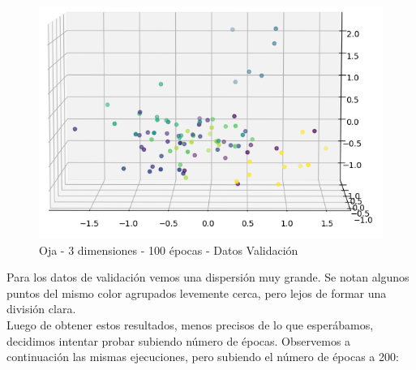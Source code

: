 \begin{figure}[h]
  \begin{center}
    \includegraphics[scale=0.65]{../img/ej1/oja/oja_3salida_100ep_validation_2.png}
  \caption{Oja - 3 dimensiones - 100 épocas - Datos Validación}
  \end{center}
\end{figure}

\newpage

Para los datos de validación vemos una dispersión muy grande. Se notan algunos puntos del mismo color agrupados levemente cerca, pero lejos
de formar una división clara.\\

Luego de obtener estos resultados, menos precisos de lo que esperábamos, decidimos intentar probar subiendo número de épocas. Observemos a continuación las mismas ejecuciones, pero subiendo el número de épocas a 200:

